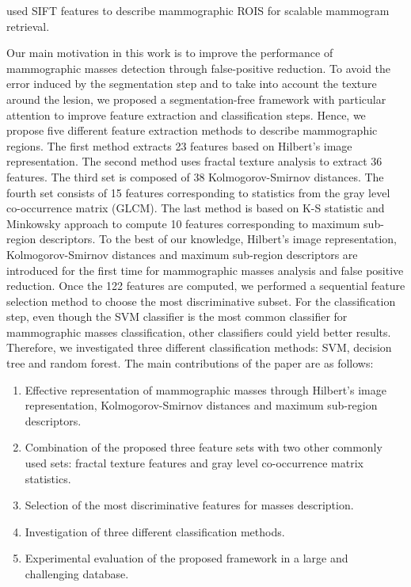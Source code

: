\documentclass[review,12pt]{elsarticle}
\begin{document}
{\cite{Jiang2015,Liu2014} used SIFT features to describe mammographic ROIS for scalable mammogram retrieval.


Our main motivation in this work is to improve the performance of mammographic masses detection through false-positive reduction. To avoid the error induced by the segmentation step and to take into account the texture around the lesion, we proposed a segmentation-free framework with particular attention to improve  feature extraction and classification steps.  Hence,   we propose five different feature extraction methods to describe mammographic regions. The first method extracts 23 features based on Hilbert’s image representation. The second method uses fractal texture analysis to extract 36 features. The third set is composed of 38 Kolmogorov-Smirnov distances. The fourth set consists of 15 features corresponding to statistics from the gray level co-occurrence matrix (GLCM). The last method is based on K-S statistic and Minkowsky approach to compute 10 features corresponding to maximum sub-region descriptors. To the best of our knowledge, Hilbert’s image representation, Kolmogorov-Smirnov distances and maximum sub-region descriptors are introduced for the first time for mammographic masses analysis and false positive reduction. Once the 122 features are computed, we performed a sequential feature selection method to choose the most discriminative subset. For the classification step, even though the SVM classifier is the most common classifier for mammographic masses classification,   other classifiers could yield better results.
Therefore, we investigated three different  classification methods: SVM, decision tree and random forest.
The main contributions of the paper are as follows:
\begin{enumerate}
 \item Effective representation of mammographic masses through Hilbert’s image representation, Kolmogorov-Smirnov distances and maximum sub-region descriptors.
  \item  Combination of the proposed three feature sets with two other commonly used sets: fractal texture features and gray level co-occurrence matrix statistics.
  \item Selection of the most discriminative features for masses description.
  \item Investigation of three different classification methods.
  \item Experimental evaluation of the proposed framework in a large and challenging database.
\end{enumerate}

}
\end{document}

